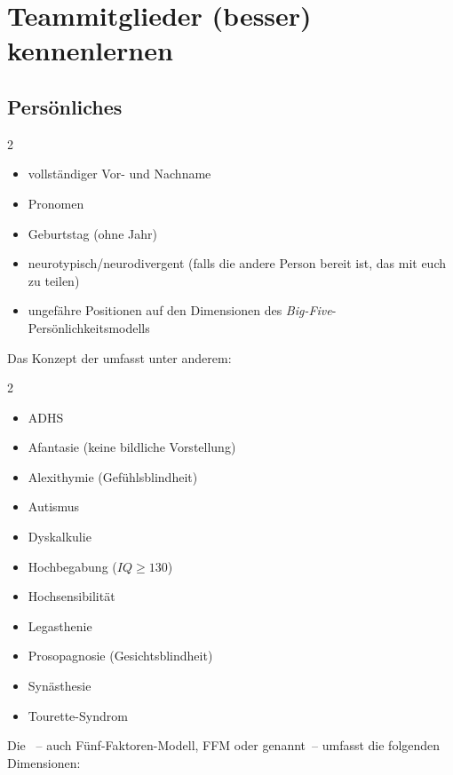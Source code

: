 \section{Teammitglieder (besser) kennenlernen}
\label{Kennenlernen}

\subsection{Persönliches}

\begin{multicols}{2}
    \begin{itemize}
        \item vollständiger Vor- und Nachname
        \item Pronomen
        \item Geburtstag (ohne Jahr)
        \item neurotypisch/neurodivergent (falls die andere Person bereit ist, das mit euch zu teilen)
        \item ungefähre Positionen auf den Dimensionen des \emph{Big-Five}-Persönlichkeitsmodells
    \end{itemize}
\end{multicols}

Das Konzept der  umfasst unter anderem:

\begin{multicols}{2}
    \begin{itemize}
        \item ADHS
        \item Afantasie (keine bildliche Vorstellung)
        \item Alexithymie (Gefühlsblindheit)
        \item Autismus
        \item Dyskalkulie
        \item Hochbegabung ($IQ \geq 130$)
        \item Hochsensibilität
        \item Legasthenie
        \item Prosopagnosie (Gesichtsblindheit)
        \item Synästhesie
        \item Tourette-Syndrom
    \end{itemize}
\end{multicols}

Die ~-- auch Fünf-Faktoren-Modell, FFM oder  genannt~-- umfasst die folgenden Dimensionen:

